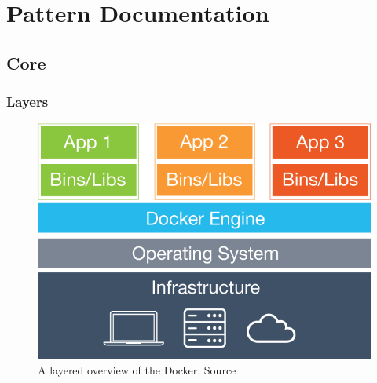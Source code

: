 
\clearpage
\chapter{Pattern Documentation}
\label{ch:patterns}


\section{Core}
\subsection{Layers}

\begin{figure}[H]
\centering
\includegraphics[scale=0.4]{5-patterns/images/what-is-vm-diagram.png}
\caption{A layered overview of the Docker. Source \cite{whatisdocker}}
\label{fig:layers-pattern}
\end{figure}

